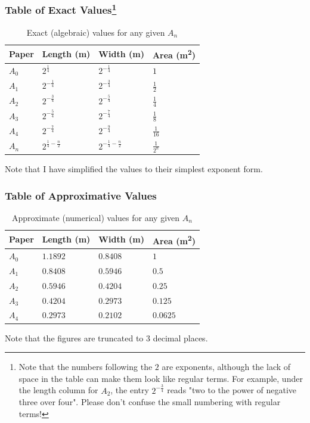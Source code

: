 \subsubsection*{Table of Exact Values\footnote{Note that the numbers following the $2$ are exponents, although the lack of space in the table can make them look like regular terms. For example, under the length column for $A_2$, the entry $2^{-\frac{3}{4}}$ reads "two to the power of negative three over four". Please don't confuse the small numbering with regular terms!}}
\begin{table}[H]
  \centering\makegapedcells
  \begin{tabular}{@{}llll@{}}
    \toprule
    Paper & Length (\si{\meter}) & Width (\si{\meter}) & Area (\si{\meter\squared}) \\ \midrule
    $A_0$ & $2^{\frac{1}{4}}$     & $2^{-\frac{1}{4}}$  & $1$     \\
    $A_1$ & $2^{-\frac{1}{4}}$    & $2^{-\frac{3}{4}}$  & $\frac{1}{2}$     \\
    $A_2$ & $2^{-\frac{3}{4}}$    & $2^{-\frac{5}{4}}$  & $\frac{1}{4}$     \\
    $A_3$ & $2^{-\frac{5}{4}}$    & $2^{-\frac{7}{4}}$  & $\frac{1}{8}$     \\
    $A_4$ & $2^{-\frac{7}{4}}$    & $2^{-\frac{9}{4}}$  & $\frac{1}{16}$    \\
    $A_n$ & $2^{\frac{1}{4} - \frac{n}{2}}$    & $2^{-\frac{1}{4} - \frac{n}{2}}$  & $\frac{1}{2^n}$    \\
    \bottomrule
  \end{tabular}
  \caption{Exact (algebraic) values for any given $A_n$}
  \label{tab:exact}
\end{table}

\noindent
Note that I have simplified the values to their simplest exponent form.

\subsubsection*{Table of Approximative Values}
\begin{table}[H]
  \centering\makegapedcells
  \begin{tabular}{@{}llll@{}}
    \toprule
    Paper & Length (\si{\meter}) & Width (\si{\meter}) & Area (\si{\meter\squared}) \\ \midrule
    $A_0$ & $1.1892$       & $0.8408$      & $1$      \\
    $A_1$ & $0.8408$       & $0.5946$      & $0.5$    \\
    $A_2$ & $0.5946$       & $0.4204$      & $0.25$   \\
    $A_3$ & $0.4204$       & $0.2973$      & $0.125$  \\
    $A_4$ & $0.2973$       & $0.2102$      & $0.0625$ \\ \bottomrule
  \end{tabular}
  \caption{Approximate (numerical) values for any given $A_n$}
  \label{tab:approx}
\end{table}

\noindent
Note that the figures are truncated to 3 decimal places.
